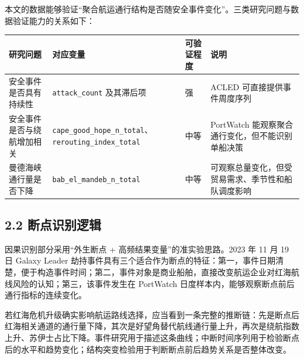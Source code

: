 \documentclass[
]{ctexart}
\begin{document}
本文的数据能够验证``聚合航运通行结构是否随安全事件变化''。三类研究问题与数据验证能力的关系如下：

\begin{longtable}[]{@{}
  >{\raggedright\arraybackslash}p{}
  >{\raggedright\arraybackslash}p{}
  >{\raggedright\arraybackslash}p{}
  >{\raggedright\arraybackslash}p{}@{}}
\toprule\noalign{}
\begin{minipage}[b]{\linewidth}\raggedright
研究问题
\end{minipage} & \begin{minipage}[b]{\linewidth}\raggedright
对应变量
\end{minipage} & \begin{minipage}[b]{\linewidth}\raggedright
可验证程度
\end{minipage} & \begin{minipage}[b]{\linewidth}\raggedright
说明
\end{minipage} \\
\midrule\noalign{}
\endhead
\bottomrule\noalign{}
\endlastfoot
安全事件是否具有持续性 & \texttt{attack\_count} 及其滞后项 & 强 & ACLED
可直接提供事件周度序列 \\
安全事件是否与绕航增加相关 &
\texttt{cape\_good\_hope\_n\_total}、\texttt{rerouting\_index\_total} &
中等 & PortWatch 能观察聚合通行变化，但不能识别单船决策 \\
曼德海峡通行量是否下降 & \texttt{bab\_el\_mandeb\_n\_total} & 中等 &
可观察总量变化，但受贸易需求、季节性和船队调度影响 \\
\end{longtable}

\subsection{2.2
断点识别逻辑}\label{ux65adux70b9ux8bc6ux522bux903bux8f91}

因果识别部分采用``外生断点 + 高频结果变量''的准实验思路。2023
年 11 月 19 日 Galaxy Leader
劫持事件具有三个适合作为断点的特征：第一，事件日期清楚，便于构造事件时间；第二，事件对象是商业船舶，直接改变航运企业对红海航线风险的认知；第三，该事件发生在
PortWatch 日度样本内，能够观察断点前后通行指标的连续变化。

若红海危机升级确实影响航运路线选择，应当看到一条完整的推断链：先是断点后红海相关通道的通行量下降，其次是好望角替代航线通行量上升，再次是绕航指数上升、苏伊士占比下降。事件研究用于描述这条曲线；中断时间序列用于检验断点后的水平和趋势变化；结构突变检验用于判断断点前后趋势关系是否整体改变。
\end{document}
